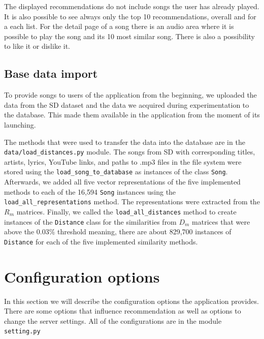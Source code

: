 The displayed recommendations do not include songs the user has already played. It is also possible to see always only the top 10 recommendations, overall and for a each list. For the detail page of a song there is an audio area where it is possible to play the song and its 10 most similar song. There is also a possibility to like it or dislike it.  

\subsection{Base data import}

To provide songs to users of the application from the beginning, we uploaded the data from the SD dataset and the data we acquired during experimentation to the database. This made them available in the application from the moment of its launching. 

The methods that were used to transfer the data into the database are in the \texttt{data/load\_distances.py} module. The songs from SD with corresponding titles, artists, lyrics, YouTube links, and paths to .mp3 files in the file system were stored using the \texttt{load\_song\_to\_database} as instances of the class \texttt{Song}. Afterwards, we added all five vector representations of the five implemented methods to each of the 16,594 \texttt{Song} instances using the \texttt{load\_all\_representations} method. The representations were extracted from the $R_m$ matrices. Finally, we called the \texttt{load\_all\_distances} method to create instances of the \texttt{Distance} class for the similarities from $D_m$ matrices that were above the 0.03\% threshold meaning, there are about 829,700 instances of \texttt{Distance} for each of the five implemented similarity methods.

\section{Configuration options}\label{sec:configurations}

In this section we will describe the configuration options the application provides. There are some options that influence recommendation as well as options to change the server settings. All of the configurations are in the module \texttt{setting.py}


